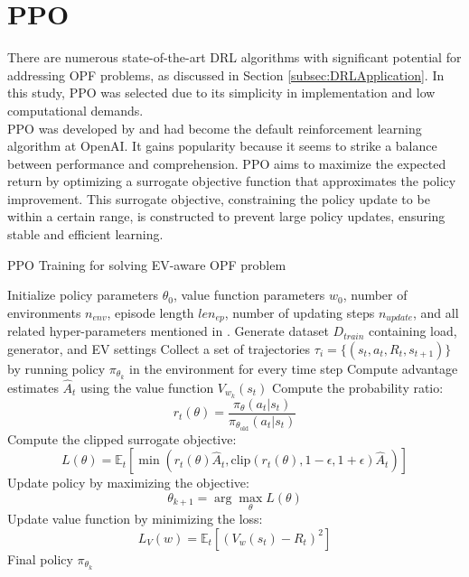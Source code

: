 \section{\acrlong{PPO}}\label{
sec:PPO}
There are numerous state-of-the-art \gls{DRL} algorithms with significant potential for addressing \gls{OPF} problems, as discussed in Section \ref{subsec:DRLApplication}. In this study, \gls{PPO} was selected due to its simplicity in implementation and low computational demands.\\
\gls{PPO} was developed by \cite{schulman2017proximal} and had become the default reinforcement learning algorithm at OpenAI. It gains popularity because it seems to strike a balance between performance and comprehension. \gls{PPO} aims to maximize the expected return by optimizing a surrogate objective function that approximates the policy improvement. This surrogate objective, constraining the policy update to be within a certain range, is constructed to prevent large policy updates, ensuring stable and efficient learning.

\begin{algorithm}
\caption{\gls{PPO} Training for solving \gls{EV}-aware \gls{OPF} problem}
\begin{algorithmic}[1]
\State Initialize policy parameters $\theta_0$, value function parameters $w_0$, number of environments $n_{env}$, episode length $len_{ep}$, number of updating steps $n_{update}$, and all related hyper-parameters mentioned in \cite{schulman2017proximal}.
 
        \State Generate dataset $D_{train}$ containing load, generator, and EV settings
         
            \State Collect a set of trajectories $\tau_i = \{(s_t, a_t, R_t, s_{t+1})\}$ by running policy $\pi_{\theta_k}$ in the environment for every time step
        \EndFor
    \EndFor
    \State Compute advantage estimates $\hat{A}_t$ using the value function $V_{w_k}(s_t)$
    \State Compute the probability ratio: 
    \[
    r_t(\theta) = \frac{\pi_{\theta}(a_t|s_t)}{\pi_{\theta_{\text{old}}}(a_t|s_t)}
    \]
    \State Compute the clipped surrogate objective:
    \[
    L(\theta) = \mathbb{E}_t \left[ \min \left( r_t(\theta) \hat{A}_t, \text{clip}(r_t(\theta), 1 - \epsilon, 1 + \epsilon) \hat{A}_t \right) \right]
    \]
    \State Update policy by maximizing the objective: 
    \[
    \theta_{k+1} = \arg \max_{\theta} L(\theta)
    \]
    \State Update value function by minimizing the loss: 
    \[
    L_V(w) = \mathbb{E}_t \left[ \left( V_w(s_t) - R_t \right)^2 \right]
    \]
\EndFor
\State \Return Final policy $\pi_{\theta_k}$
\end{algorithmic}
\end{algorithm}

